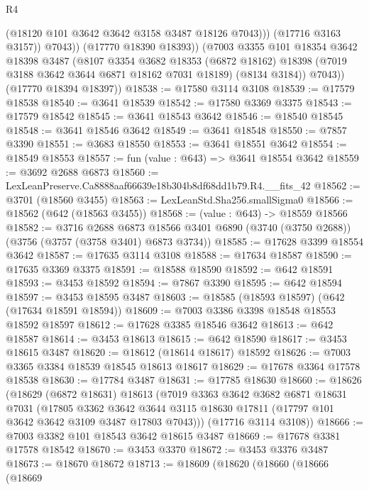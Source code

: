 \begin{lexlean}{R4}
\begin{coremodule}
                    (@18120 @101 @3642 @3642 @3158 @3487 @18126 @7043)))
                (@17716 @3163 @3157))
              @7043))
          (@17770 @18390 @18393))
        (@7003
          @3355
          @101
          @18354
          @3642
          @18398
          @3487
          (@8107
            @3354
            @3682
            @18353
            (@6872 @18162)
            @18398
            (@7019 @3188 @3642 @3644 @6871 @18162 @7031 @18189)
            (@8134 @3184))
          @7043))
      (@17770 @18394 @18397))
@18538 := @17580 @3114 @3108
@18539 := @17579 @18538
@18540 := @3641 @18539
@18542 := @17580 @3369 @3375
@18543 := @17579 @18542
@18545 := @3641 @18543 @3642
@18546 := @18540 @18545
@18548 := @3641 @18546 @3642
@18549 := @3641 @18548
@18550 := @7857 @3390
@18551 := @3683 @18550
@18553 := @3641 @18551 @3642
@18554 := @18549 @18553
@18557 := fun (value : @643) => @3641 @18554 @3642
@18559 := @3692 @2688 @6873
@18560 := LexLeanPreserve.Ca8888aaf66639e18b304b8df68dd1b79.R4.__fits_42
@18562 := @3701 (@18560 @3455)
@18563 := LexLeanStd.Sha256.smallSigma0
@18566 := @18562 (@642 (@18563 @3455))
@18568 := (value : @643) -> @18559 @18566
@18582 := @3716
    @2688
    @6873
    @18566
    @3401
    @6890
    (@3740 (@3750 @2688))
    (@3756 (@3757 (@3758 @3401) @6873 @3734))
@18585 := @17628 @3399 @18554 @3642
@18587 := @17635 @3114 @3108
@18588 := @17634 @18587
@18590 := @17635 @3369 @3375
@18591 := @18588 @18590
@18592 := @642 @18591
@18593 := @3453 @18592
@18594 := @7867 @3390
@18595 := @642 @18594
@18597 := @3453 @18595 @3487
@18603 := @18585 (@18593 @18597) (@642 (@17634 @18591 @18594))
@18609 := @7003 @3386 @3398 @18548 @18553 @18592 @18597
@18612 := @17628 @3385 @18546 @3642
@18613 := @642 @18587
@18614 := @3453 @18613
@18615 := @642 @18590
@18617 := @3453 @18615 @3487
@18620 := @18612 (@18614 @18617) @18592
@18626 := @7003 @3365 @3384 @18539 @18545 @18613 @18617
@18629 := @17678 @3364 @17578 @18538
@18630 := @17784 @3487
@18631 := @17785 @18630
@18660 := @18626
    (@18629
      (@6872 @18631)
      @18613
      (@7019
        @3363
        @3642
        @3682
        @6871
        @18631
        @7031
        (@17805
          @3362
          @3642
          @3644
          @3115
          @18630
          @17811
          (@17797 @101 @3642 @3642 @3109 @3487 @17803 @7043)))
      (@17716 @3114 @3108))
@18666 := @7003 @3382 @101 @18543 @3642 @18615 @3487
@18669 := @17678 @3381 @17578 @18542
@18670 := @3453 @3370
@18672 := @3453 @3376 @3487
@18673 := @18670 @18672
@18713 := @18609
    (@18620
      (@18660
        (@18666
          (@18669

\end{coremodule}
\end{lexlean}
